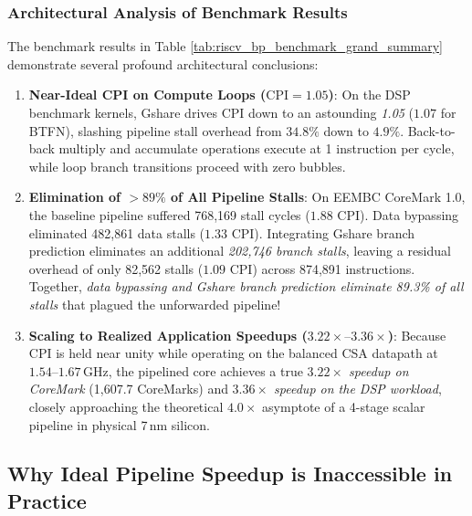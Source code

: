 \subsubsection{Architectural Analysis of Benchmark Results}
The benchmark results in Table \ref{tab:riscv_bp_benchmark_grand_summary} demonstrate several profound architectural conclusions:
\begin{enumerate}
    \item \textbf{Near-Ideal CPI on Compute Loops ($\text{CPI} = 1.05$)}:
    On the DSP benchmark kernels, Gshare drives CPI down to an astounding \textit{1.05} ($1.07$ for BTFN), slashing pipeline stall overhead from $34.8\%$ down to \textit{$4.9\%$}. Back-to-back multiply and accumulate operations execute at 1 instruction per cycle, while loop branch transitions proceed with zero bubbles.
    
    \item \textbf{Elimination of $>89\%$ of All Pipeline Stalls}:
    On EEMBC CoreMark 1.0, the baseline pipeline suffered 768,169 stall cycles ($1.88$ CPI). Data bypassing eliminated 482,861 data stalls ($1.33$ CPI). Integrating Gshare branch prediction eliminates an additional \textit{202,746 branch stalls}, leaving a residual overhead of only 82,562 stalls ($1.09$ CPI) across 874,891 instructions. Together, \textit{data bypassing and Gshare branch prediction eliminate 89.3\% of all stalls} that plagued the unforwarded pipeline!
    
    \item \textbf{Scaling to Realized Application Speedups ($3.22\times\text{--}3.36\times$)}:
    Because CPI is held near unity while operating on the balanced CSA datapath at $1.54\text{--}1.67\,\text{GHz}$, the pipelined core achieves a true \textit{$3.22\times$ speedup on CoreMark} (1,607.7 CoreMarks) and \textit{$3.36\times$ speedup on the DSP workload}, closely approaching the theoretical $4.0\times$ asymptote of a 4-stage scalar pipeline in physical 7\,nm silicon.
\end{enumerate}


\subsection{Why Ideal Pipeline Speedup is Inaccessible in Practice}\label{riscvIdealSpeedupLimits}

